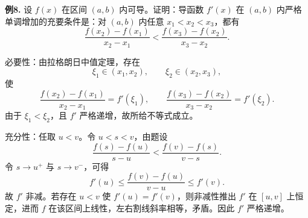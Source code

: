 \begin{problemblock}
\textbf{例8.} 设 \(f(x)\) 在区间 \((a,b)\) 内可导。证明：导函数 \(f'(x)\) 在 \((a,b)\) 内严格单调增加的充要条件是：对 \((a,b)\) 内任意 \(x_1<x_2<x_3\)，都有
\[
\frac{f(x_2)-f(x_1)}{x_2-x_1}
<
\frac{f(x_3)-f(x_2)}{x_3-x_2}.
\]
\end{problemblock}
\begin{solutionblock}
必要性：由拉格朗日中值定理，存在
\[
\xi_1\in(x_1,x_2),\qquad \xi_2\in(x_2,x_3),
\]
使
\[
\frac{f(x_2)-f(x_1)}{x_2-x_1}=f'(\xi_1),\qquad
\frac{f(x_3)-f(x_2)}{x_3-x_2}=f'(\xi_2).
\]
由于 \(\xi_1<\xi_2\)，且 \(f'\) 严格递增，故所给不等式成立。

充分性：任取 \(u<v\)。令 \(u<s<v\)，由题设
\[
\frac{f(s)-f(u)}{s-u}
<
\frac{f(v)-f(s)}{v-s}.
\]
令 \(s\to u^+\) 与 \(s\to v^-\)，可得
\[
f'(u)\le\frac{f(v)-f(u)}{v-u}\le f'(v).
\]
故 \(f'\) 非减。若存在 \(u<v\) 使 \(f'(u)=f'(v)\)，则非减性推出 \(f'\) 在 \([u,v]\) 上恒定，进而 \(f\) 在该区间上线性，左右割线斜率相等，矛盾。因此 \(f'\) 严格递增。
\end{solutionblock}

